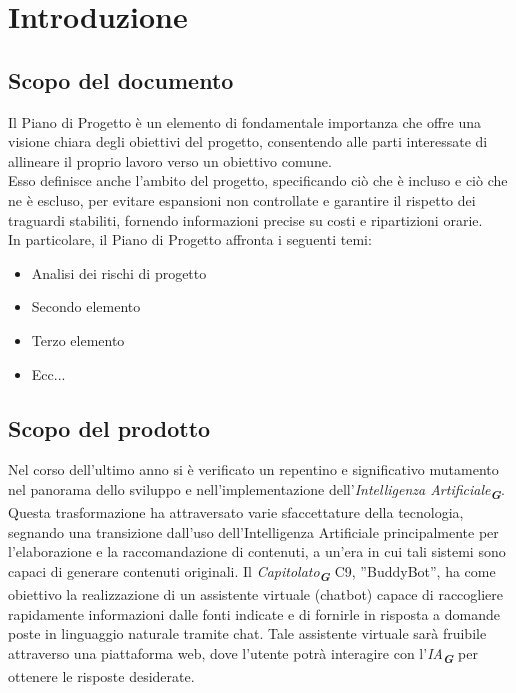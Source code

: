 

\section{Introduzione}
\label{sec:introduzione}

\subsection{Scopo del documento}
Il Piano di Progetto è un elemento di fondamentale importanza che offre una visione chiara degli obiettivi del progetto, 
consentendo alle parti interessate di allineare il proprio lavoro verso un obiettivo comune.\\
Esso definisce anche l'ambito del progetto, specificando ciò che è incluso e ciò che ne è escluso, per evitare espansioni 
non controllate e garantire il rispetto dei traguardi stabiliti, fornendo informazioni precise su costi e ripartizioni orarie.\\
In particolare, il Piano di Progetto affronta i seguenti temi:
\begin{itemize}
    \item Analisi dei rischi di progetto
    \item Secondo elemento
    \item Terzo elemento
    \item Ecc...
\end{itemize}

\subsection{Scopo del prodotto}
Nel corso dell’ultimo anno si è verificato un repentino e significativo mutamento nel panorama dello sviluppo e nell’implementazione dell’\emph{Intelligenza Artificiale}\textsubscript{\textit{\textbf{G}}}. Questa trasformazione ha attraversato varie sfaccettature della tecnologia, segnando una transizione dall’uso dell’Intelligenza Artificiale principalmente per l’elaborazione e la raccomandazione di contenuti, a un’era in cui tali sistemi sono capaci di generare contenuti originali.
Il \emph{Capitolato}\textsubscript{\textit{\textbf{G}}} C9, ”BuddyBot”, ha come obiettivo la realizzazione di un assistente virtuale (chatbot) capace di raccogliere rapidamente informazioni dalle fonti indicate e di fornirle in risposta a domande poste in linguaggio naturale tramite chat.
Tale assistente virtuale sarà fruibile attraverso una piattaforma web, dove l’utente potrà interagire con l'\emph{IA}\textsubscript{\textit{\textbf{G}}} per ottenere le risposte desiderate.

